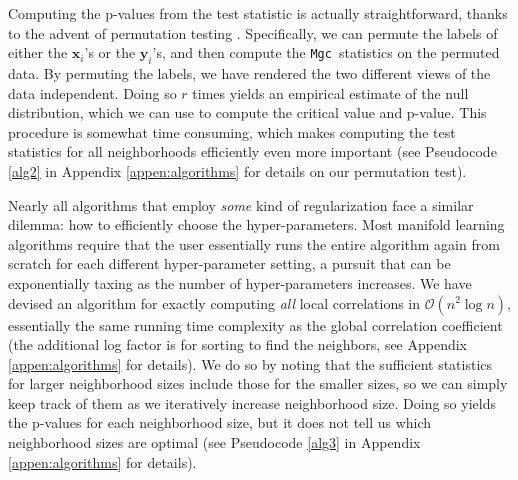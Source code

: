\documentclass[11pt]{article}
\newcommand{\note}[2][]{\added[#1,remark={#2}]{}}
\providecommand{\sct}[1]{{\sc \texttt{#1}}}
\providecommand{\mb}[1]{\boldsymbol{#1}}
\providecommand{\mc}[1]{\mathcal{#1}}
\newcommand{\Mgc}{\sct{Mgc}}
\newcommand{\cs}[1]{{\note{cs: #1}}}
\newcommand{\mbx}{\ensuremath{\mb{x}}}
\newcommand{\mby}{\ensuremath{\mb{y}}}
\begin{document}
Computing the p-values from the test statistic is actually straightforward, thanks to the advent of permutation testing \cite{Good2005}.  Specifically, we can permute the labels of either the $\mbx_i$'s or the $\mby_i$'s, and then compute the \Mgc~statistics on the permuted data.  By permuting the labels, we have rendered the two different views of the data independent.  Doing so $r$ times yields an empirical estimate of the null distribution, which we can use to compute the critical value and p-value. This procedure is somewhat time consuming, which makes computing the test statistics for all neighborhoods efficiently even more important (see Pseudocode \ref{alg2} in Appendix \ref{appen:algorithms} for details on our permutation test).


Nearly all algorithms that employ \emph{some} kind of regularization face a similar dilemma: how to efficiently choose the hyper-parameters. 
Most  manifold learning algorithms require that the user essentially runs the entire algorithm again from scratch for each different hyper-parameter setting, a pursuit that can be exponentially taxing as the number of hyper-parameters increases.
We have devised an algorithm for exactly computing \emph{all} local correlations in $\mc{O}(n^2 \log n)$, essentially the same running time complexity as the global correlation coefficient (the additional log factor is for sorting to find the neighbors, see Appendix \ref{appen:algorithms} for details).  
We do so by noting that the sufficient statistics for larger neighborhood sizes include those for the smaller sizes, so we can simply keep track of them as we iteratively increase neighborhood size. Doing so yields the p-values for each neighborhood size, but it does not tell us which neighborhood sizes are optimal (see Pseudocode \ref{alg3} in Appendix \ref{appen:algorithms} for details).
\cs{seemed redundant: which allows our definition of local correlations to be an efficient and general tool in data analysis.}
\end{document}
